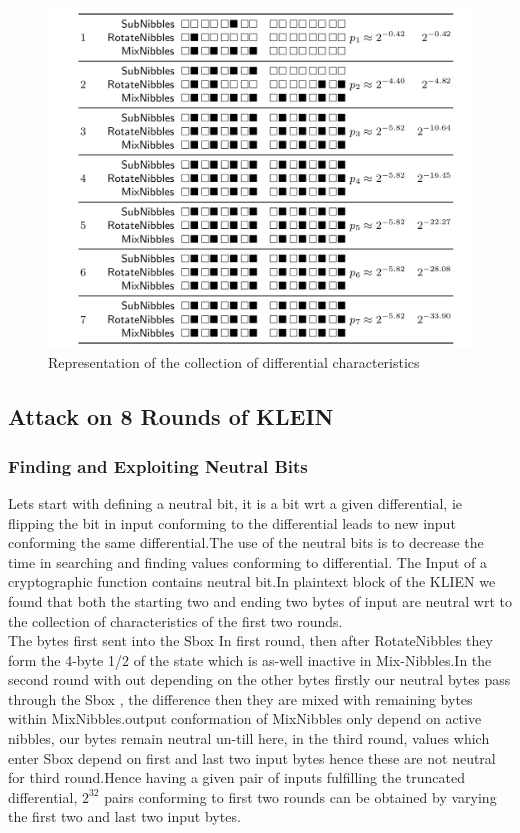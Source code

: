 \documentclass[preprint]{transcrypto}
\begin{document}
\begin{figure}
    \centering
    \includegraphics[width= \textwidth]{images/Representationcollectiondifferentialcharacteristics.png} 
    \caption{Representation of the collection of differential characteristics\cite{8round}}
    \label{fig:6distinguisher}
\end{figure}

\subsection{Attack on 8 Rounds of KLEIN}

\subsubsection{Finding and Exploiting Neutral Bits}
Lets start with defining a neutral bit, it is a bit wrt a given differential, ie flipping the bit in input conforming to the differential leads to new input conforming the same differential.The use of the  neutral bits is to decrease the time in searching and finding values conforming to differential.
The Input of a cryptographic function contains neutral bit.In plaintext block of the KLIEN we found that both the starting two and ending two bytes of input are neutral wrt to the collection of characteristics of the first two rounds.\\

The bytes first sent into the Sbox In first round, then after RotateNibbles they form the 4-byte 1/2 of the state which is as-well inactive in Mix-Nibbles.In the second round with out depending on the other bytes firstly our neutral bytes pass through the Sbox , the difference then they are mixed with remaining bytes within MixNibbles.output conformation of MixNibbles only depend on active nibbles, our bytes remain neutral un-till here, in the third round, values which enter Sbox depend on first and last two input bytes hence these are not neutral for third round.Hence having a given pair of inputs fulfilling the truncated differential, $2^{32}$ pairs conforming to first two rounds can be obtained by varying the first two and last two input bytes.\\
\end{document}
